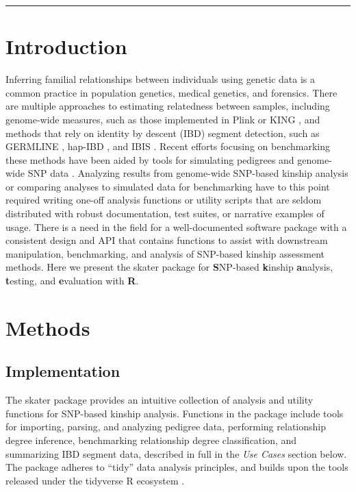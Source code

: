 \documentclass[9pt,a4paper,]{extarticle}
\begin{document}
\begin{center}\rule{0.5\linewidth}{0.5pt}\end{center}

\hypertarget{introduction}{%
\section{Introduction}\label{introduction}}

Inferring familial relationships between individuals using genetic data is a common practice in population genetics, medical genetics, and forensics. There are multiple approaches to estimating relatedness between samples, including genome-wide measures, such as those implemented in Plink \citep{purcell2007} or KING \citep{manichaikul2010}, and methods that rely on identity by descent (IBD) segment detection, such as GERMLINE \citep{gusev2009}, hap-IBD \citep{zhou2020}, and IBIS \citep{seidman2020}. Recent efforts focusing on benchmarking these methods \citep{ramstetter2017} have been aided by tools for simulating pedigrees and genome-wide SNP data \citep{caballero2019}. Analyzing results from genome-wide SNP-based kinship analysis or comparing analyses to simulated data for benchmarking have to this point required writing one-off analysis functions or utility scripts that are seldom distributed with robust documentation, test suites, or narrative examples of usage. There is a need in the field for a well-documented software package with a consistent design and API that contains functions to assist with downstream manipulation, benchmarking, and analysis of SNP-based kinship assessment methods. Here we present the skater package for \textbf{S}NP-based \textbf{k}inship \textbf{a}nalysis, \textbf{t}esting, and \textbf{e}valuation with \textbf{R}.

\hypertarget{methods}{%
\section{Methods}\label{methods}}

\hypertarget{implementation}{%
\subsection{Implementation}\label{implementation}}

The skater package provides an intuitive collection of analysis and utility functions for SNP-based kinship analysis. Functions in the package include tools for importing, parsing, and analyzing pedigree data, performing relationship degree inference, benchmarking relationship degree classification, and summarizing IBD segment data, described in full in the \emph{Use Cases} section below. The package adheres to ``tidy'' data analysis principles, and builds upon the tools released under the tidyverse R ecosystem \citep{Wickham2019}.
\end{document}
